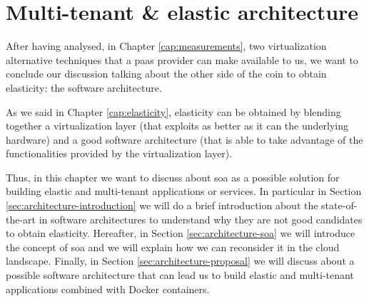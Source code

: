 %
%
\chapter{Multi-tenant \& elastic architecture}
\label{cap:architecture}
After having analysed, in Chapter \ref{cap:measurements}, two virtualization alternative techniques that
a \ac{paas} provider can make available to us, we want to conclude our discussion talking about the other
side of the coin to obtain elasticity: the software architecture.

As we said in Chapter \ref{cap:elasticity}, elasticity can be obtained by blending together a virtualization
layer (that exploits as better as it can the underlying hardware) and a good software architecture (that is
able to take advantage of the functionalities provided by the virtualization layer).

Thus, in this chapter we want to discuss about \acf{soa} as a possible solution for building elastic and
multi-tenant applications or services. In particular in Section \ref{sec:architecture-introduction} we will
do a brief introduction about the state-of-the-art in software architectures to understand why they are not
good candidates to obtain elasticity. Hereafter, in Section \ref{sec:architecture-soa} we will introduce
the concept of \ac{soa} and we will explain how we can reconsider it in the cloud landscape. Finally, in
Section \ref{sec:architecture-proposal} we will discuss about a possible software architecture that can lead 
us to build elastic and multi-tenant applications combined with Docker containers.







